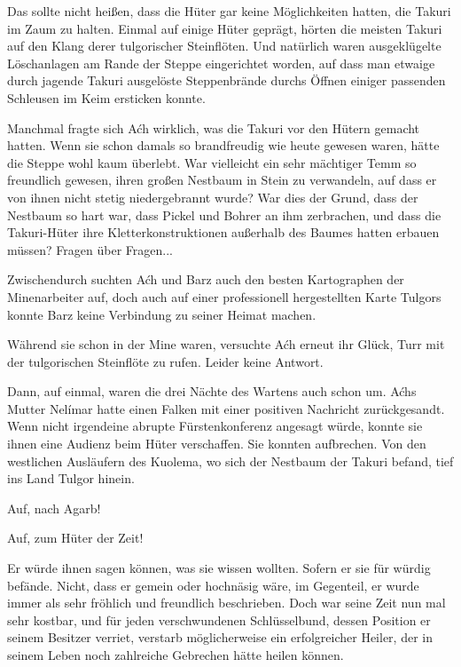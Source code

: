 Das sollte nicht heißen, dass die Hüter gar keine Möglichkeiten hatten, die Takuri im Zaum zu halten. Einmal auf einige Hüter geprägt, hörten die meisten Takuri auf den Klang derer tulgorischer Steinflöten. Und natürlich waren ausgeklügelte Löschanlagen am Rande der Steppe eingerichtet worden, auf dass man etwaige durch jagende Takuri ausgelöste Steppenbrände durchs Öffnen einiger passenden Schleusen im Keim ersticken konnte.

Manchmal fragte sich Aćh wirklich, was die Takuri vor den Hütern gemacht hatten. Wenn sie schon damals so brandfreudig wie heute gewesen waren, hätte die Steppe wohl kaum überlebt. War vielleicht ein sehr mächtiger Temm so freundlich gewesen, ihren großen Nestbaum in Stein zu verwandeln, auf dass er von ihnen nicht stetig niedergebrannt wurde? War dies der Grund, dass der Nestbaum so hart war, dass Pickel und Bohrer an ihm zerbrachen, und dass die Takuri-Hüter ihre Kletterkonstruktionen außerhalb des Baumes hatten erbauen müssen? Fragen über Fragen...

Zwischendurch suchten Aćh und Barz auch den besten Kartographen der Minenarbeiter auf, doch auch auf einer professionell hergestellten Karte Tulgors konnte Barz keine Verbindung zu seiner Heimat machen.

Während sie schon in der Mine waren, versuchte Aćh erneut ihr Glück, Turr mit der tulgorischen Steinflöte zu rufen. Leider keine Antwort.



\trennzeichen



Dann, auf einmal, waren die drei Nächte des Wartens auch schon um. Aćhs Mutter Nelímar hatte einen Falken mit einer positiven Nachricht zurückgesandt. Wenn nicht irgendeine abrupte Fürstenkonferenz angesagt würde, konnte sie ihnen eine Audienz beim Hüter verschaffen. Sie konnten aufbrechen. Von den westlichen Ausläufern des Kuolema, wo sich der Nestbaum der Takuri befand, tief ins Land Tulgor hinein.

Auf, nach Agarb!

Auf, zum Hüter der Zeit!

Er würde ihnen sagen können, was sie wissen wollten. Sofern er sie für würdig befände. Nicht, dass er gemein oder hochnäsig wäre, im Gegenteil, er wurde immer als sehr fröhlich und freundlich beschrieben. Doch war seine Zeit nun mal sehr kostbar, und für jeden verschwundenen Schlüsselbund, dessen Position er seinem Besitzer verriet, verstarb möglicherweise ein erfolgreicher Heiler, der in seinem Leben noch zahlreiche Gebrechen hätte heilen können.

